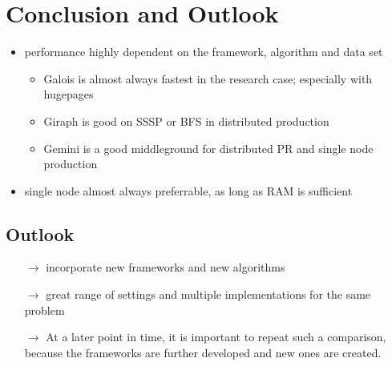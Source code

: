 \documentclass{meetings}
\begin{document}
\section{Conclusion and Outlook}
\begin{itemize}
	\item performance highly dependent on the framework, algorithm and data set
	\begin{itemize}
		\item Galois is almost always fastest in the research case; especially with hugepages
		\item Giraph is good on SSSP or BFS in distributed production
		\item Gemini is a good middleground for distributed PR and single node production
	\end{itemize}
	
	\item single node almost always preferrable, as long as RAM is sufficient
\end{itemize}


\subsection{Outlook}
\begin{itemize}
	\item[$\rightarrow$] incorporate new frameworks and new algorithms
	\item[$\rightarrow$] great range of settings and multiple implementations for the same problem
	\item[$\rightarrow$] At a later point in time, it is important to repeat such a comparison, because the frameworks are further developed and new ones are created.
\end{itemize}
\end{document}
